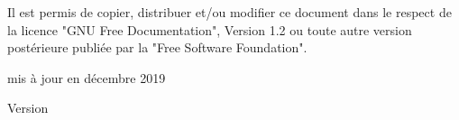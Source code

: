 {\begin{titlepage}
    Il est permis de copier, distribuer et/ou modifier ce document dans le respect de la licence "GNU Free Documentation", Version 1.2 ou toute autre version postérieure publiée par la "Free Software Foundation".

    mis à jour en décembre 2019
    \end{titlepage}
    \pagestyle{headings}
    \clearemptydoublepage \pagestyle{headings}
}{%
    \begin{titlepage}
        \large{Version \DocVersion}
    \end{titlepage}
    \clearemptydoublepage \pagestyle{headings}
    \clearemptydoublepage {}
}
\makeatother
